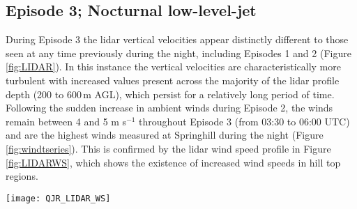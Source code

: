 \documentclass[times]{qjrms4}
\begin{document}
%
%

\subsection{Episode 3; Nocturnal low-level-jet}
\label{ep3}
During Episode 3 the lidar vertical velocities appear distinctly different to those seen at any time previously during the night, including Episodes 1 and 2 (Figure \ref{fig:LIDAR}). In this instance the vertical velocities are characteristically more turbulent with increased values present across the majority of the lidar profile depth (200 to 600$\,\mbox{m}$ AGL), which  persist for a relatively long period of time. Following the sudden increase in ambient winds during Episode 2, the winds remain between 4 and 5 m s$^{-1}$ throughout Episode 3 (from 03:30 to 06:00 UTC) and are the highest winds measured at Springhill during the night (Figure \ref{fig:windtseries}). This is confirmed by the lidar wind speed profile in Figure \ref{fig:LIDARWS}, which shows the existence of increased wind speeds in hill top regions.
%
       \begin{figure*}
        \centering
        \texttt{[image: QJR\_LIDAR\_WS]}
        \caption{Time series of NCAS lidar measurements of horizontal wind speed taken at Duffryn. The dashed line indicates local hill tops.}
        \label{fig:LIDARWS}
        \end{figure*}
\end{document}
